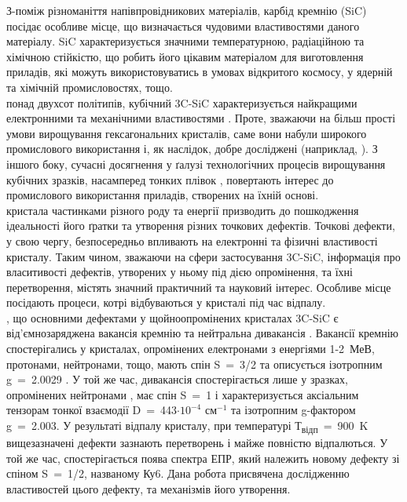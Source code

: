 З-поміж різноманіття напівпровідникових матеріалів, карбід кремнію (SiC) посідає особливе місце, що визначається чудовими властивостями даного матеріалу. SiC характеризується значними температурною, радіаційною та хімічною стійкістю, що робить його цікавим матеріалом для виготовлення приладів, які можуть використовуватись в умовах відкритого космосу, у ядерній та хімічній промисловостях, тощо.\\
 понад двухсот політипів, кубічний 3C-SiC характеризується найкращими електронними та механічними властивостями \citep{choy1}. Проте, зважаючи на більш прості умови вирощування гексагональних кристалів, саме вони набули широкого промислового використання і, як наслідок, добре досліджені (наприклад, \citep{hex1} \citep{hex2}). З іншого боку, сучасні досягнення у ґалузі технологічних процесів вирощування кубічних зразків, насамперед тонких плівок \citep{epilay}, повертають інтерес до промислового використання приладів, створених на їхній основі.\\
 кристала частинками різного роду та енергії призводить до пошкодження ідеальності його ґратки та утворення різних точкових дефектів. Точкові дефекти, у свою чергу, безпосередньо впливають на електронні та фізичні властивості кристалу. Таким чином, зважаючи на сфери застосування 3C-SiC, інформація про власитивості дефектів, утворених у ньому під дією опромінення, та їхні перетворення, містять значний практичний та науковий інтерес. Особливе місце посідають процеси, котрі відбуваються у кристалі під час відпалу.\\
, що основними дефектами у щойноопромінених кристалах 3C-SiC є від'ємнозаряджена вакансія кремнію \citep{t1} та нейтральна дивакансія \citep{ky5}. Вакансії кремнію спостерігались у кристалах, опромінених електронами з енергіями 1-2~МеВ, протонами, нейтронами, тощо, мають спін S~=~3/2 та описується ізотропним g~=~2.0029 \citep{t1}. У той же час, дивакансія спостерігається лише у зразках, опромінених нейтронами \citep{ky5}, має спін S~=~1 і характеризується аксіальним тензорам тонкої взаємодії D~=~443$\cdot10^{-4}$ см$^{-1}$ та ізотропним g-фактором g~=~2.003. У результаті відпалу кристалу, при температурі Т\textsubscript{відп}~=~900~K вищезазначені дефекти зазнають перетворень і майже повністю відпалються. У той же час, спостерігається поява спектра ЕПР, який належить новому дефекту зі спіном S~=~1/2, названому Ку6. Дана робота присвячена дослідженню властивостей цього дефекту, та механізмів його утворення.
